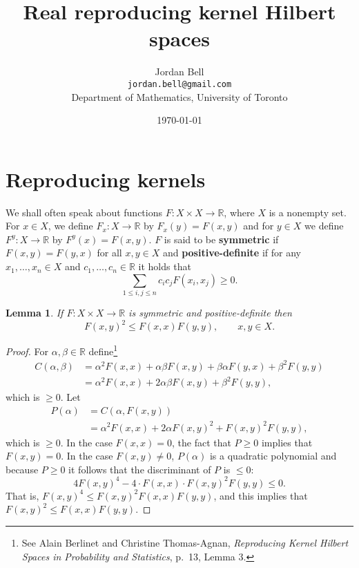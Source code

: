 \documentclass{article}
\newtheorem{lemma}[theorem]{Lemma}
\theoremstyle{definition}
\begin{document}
\title{Real reproducing kernel Hilbert spaces}
\author{Jordan Bell\\ \texttt{jordan.bell@gmail.com}\\Department of Mathematics, University of Toronto}
\date{\today}

\maketitle

\section{Reproducing kernels}
We shall often speak about functions $F:X \times X \to \mathbb{R}$, where $X$ is a nonempty set. For $x \in X$, we define
$F_x:X \to \mathbb{R}$ by $F_x(y)=F(x,y)$ and for $y \in X$ we define $F^y:X \to \mathbb{R}$ by $F^y(x)=F(x,y)$. 
$F$ is said to be \textbf{symmetric} if
$F(x,y)=F(y,x)$ for all $x,y \in X$ and \textbf{positive-definite} if for any
$x_1,\ldots,x_n \in X$ and $c_1,\ldots,c_n \in \mathbb{R}$ it holds that
\[
\sum_{1 \leq i,j \leq n} c_i c_j F(x_i,x_j) \geq 0.
\]

\begin{lemma}
If $F:X \times X \to \mathbb{R}$ is symmetric and positive-definite then
\[
F(x,y)^2 \leq F(x,x) F(y,y),\qquad x,y \in X.
\]
\label{CS}
\end{lemma}
\begin{proof}
For $\alpha,\beta \in \mathbb{R}$
define\footnote{See 
Alain Berlinet and Christine Thomas-Agnan, {\em Reproducing Kernel Hilbert Spaces
in Probability and Statistics}, p.~13, Lemma 3.}
\begin{align*}
C(\alpha,\beta)&=\alpha^2 F(x,x) + \alpha \beta F(x,y) +  \beta \alpha F(y,x) + \beta^2 F(y,y)\\
&=\alpha^2 F(x,x) + 2\alpha \beta F(x,y) + \beta^2 F(y,y),
\end{align*}
which is $\geq 0$.
Let
\begin{align*}
P(\alpha) &= C(\alpha,F(x,y))\\
&=\alpha^2 F(x,x)+2\alpha F(x,y)^2 + F(x,y)^2 F(y,y),
\end{align*}
which is $\geq 0$. In the case $F(x,x)=0$, the fact that $P \geq 0$ implies that $F(x,y)=0$.
In the case $F(x,y) \neq 0$, $P(\alpha)$ is a quadratic polynomial and because $P \geq 0$ it follows that the  discriminant of $P$ is $\leq 0$:
\[
4F(x,y)^4 - 4\cdot F(x,x) \cdot F(x,y)^2 F(y,y) \leq 0.
\]
That is,  $F(x,y)^4 \leq F(x,y)^2 F(x,x) F(y,y)$, and this implies that
$F(x,y)^2 \leq F(x,x) F(y,y)$.
\end{proof}
\end{document}
